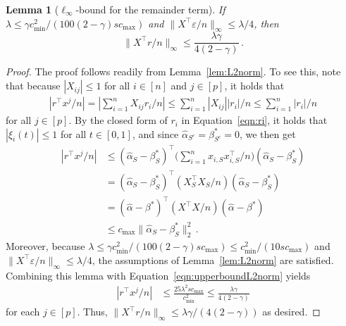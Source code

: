 \documentclass{elsarticle}
\newtheorem{lemma}{Lemma}
\def\T{\top}
\newcommand\norm[1]{\lVert#1\rVert}
\newcommand{\truepara}{{\beta^*}}
\newcommand{\trueparas}{{\beta^*_{S}}}
\newcommand{\trueparasc}{{\beta^*_{{S}^c}}}
\newcommand{\tuning}{{\lambda}}
\newcommand{\primal}{{\hat{\alpha}}}
\newcommand{\prims}{{\hat{\alpha}_{S}}}
\newcommand{\primsc}{{\hat{\alpha}_{{S}^c}}}
\newcommand{\res}{r}
\begin{document}
\begin{lemma}[$\ell_{\infty}$-bound for the remainder term]
\label{lem:Linfnorm}
  If $\lambda \leq \gamma c_{\min}^2/(100(2-\gamma)sc_{\max})$ and $\norm{X^\T \varepsilon/n}_{\infty} \leq \tuning/4$, then
  \[
  \norm{X^\T \res/n}_{\infty}\leq \frac{\tuning \gamma}{4(2-\gamma)}\,.
  \]
\end{lemma}
\begin{proof}\enspace
The proof follows readily from Lemma~\ref{lem:L2norm}.
To see this, note that because $|X_{ij}|\leq 1$ for all $i\in [n]$ and $j\in [p]$, it holds that
  \begin{equation*}
    \begin{aligned}
      |\res^{\T} x^j/n|=|\sum_{i=1}^n X_{ij}r_i/n|\leq \sum_{i=1}^n|X_{ij}
      ||r_i|/n\leq \sum_{i=1}^n|r_i|/n
      \end{aligned}
  \end{equation*}
    for all $j\in[p]$. By the closed form of $r_i$ in Equation~\eqref{eqn:ri}, it holds that
    $|\xi_i(t)|\leq 1$ for all $t\in[0,1]$, and since $\primsc=\trueparasc=0$, we then get
    \begin{equation}\label{eqn:upperboundL2norm}
    \begin{aligned}
      |\res^{\T} x^j/n|&\leq (\prims-\trueparas)^\T\Big(\sum_{i=1}^n x_{i,S}x_{i,S}^\T/n\Big)(\prims-\trueparas)
      \\
      &=(\prims-\trueparas)^\T (X_{S}^\T X_{S}/n)(\prims-\trueparas)\\
      &=(\primal - \truepara)^\T (X^\T X/n)(\primal-\truepara)\\
      &\leq  c_{\max} \norm{\prims-\trueparas}_2^2\,.
    \end{aligned}
  \end{equation}
 Moreover,  because $\lambda \leq \gamma c_{\min}^2/(100(2-\gamma)sc_{\max})\leq  c_{\min}^2/(10sc_{\max})$ and $\norm{X^\T \varepsilon/n}_{\infty} \leq \tuning/4$, the assumptions of Lemma~\ref{lem:L2norm} are satisfied. Combining this lemma with Equation~\eqref{eqn:upperboundL2norm} yields
  \begin{equation*}
    \begin{aligned}
      |\res^{\T} x^j/n|&\leq \frac{25\tuning^2 sc_{\max}}{c_{\min}^2}
      \leq \frac{\tuning \gamma}{4(2-\gamma)}
    \end{aligned}
  \end{equation*}
  for each $j\in [p]$. Thus, $\norm{X^\T \res/n}_{\infty}\leq \tuning \gamma/(4(2-\gamma))$ as desired.
\end{proof}
\end{document}
